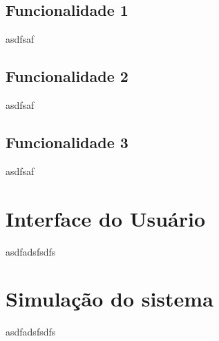 \subsection{Funcionalidade 1}
\label{ssec:func1}
asdfsaf

\subsection{Funcionalidade 2}
\label{ssec:func2}
asdfsaf

\subsection{Funcionalidade 3}
\label{ssec:func3}
asdfsaf

\section{Interface do Usuário}
\label{sec:ui}
asdfadsfsdfs

\section{Simulação do sistema}
\label{sec:sim}
asdfadsfsdfs

